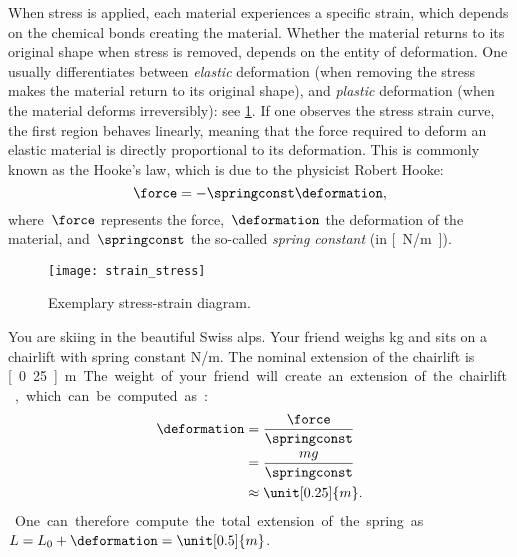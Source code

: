     When stress is applied, each material experiences a specific strain, which depends on the chemical bonds creating the material.
    Whether the material returns to its original shape when stress is removed, depends on the entity of deformation.
    One usually differentiates between \emph{elastic} deformation (when removing the stress makes the material return to its original shape), and \emph{plastic} deformation (when the material deforms irreversibly): see \cref{fig:stress_strain}.
    If one observes the stress \vs strain curve, the first region behaves linearly, meaning that the force required to deform an elastic material is directly proportional to its deformation.
    This is commonly known as the Hooke's law, which is due to the physicist Robert Hooke:
    \begin{equation}
        \force=-\springconst \deformation,
    \end{equation}
    where~$\force$ represents the force,~$\deformation$ the deformation of the material, and~$\springconst$ the so-called \emph{spring constant} (in \unit[]{[N/m]}).

    \begin{figure}[h]
        \centering
        \texttt{[image: strain\_stress]}
        \caption{Exemplary stress-strain diagram. }
        \label{fig:stress_strain}
    \end{figure}

    \begin{example}
        \label{exa:chairlift}
        You are skiing in the beautiful Swiss alps.
        Your friend weighs \unit[100]{kg} and sits on a chairlift with spring constant \unit[4,000]{N/m}.
        The nominal extension of the chairlift is \unit[0.25]{m}.
        The weight of your friend will create an extension of the chairlift, which can be computed as:
        \begin{equation}
            \begin{aligned}
                \deformation & =\frac{\force}{\springconst} \\
                             & =\frac{mg}{\springconst} \\
                             & \approx \unit[0.25]{m}.
            \end{aligned}
        \end{equation}
        One can therefore compute the total extension of the spring as~$L=L_0+\deformation=\unit[0.5]{m}$.
    \end{example}


